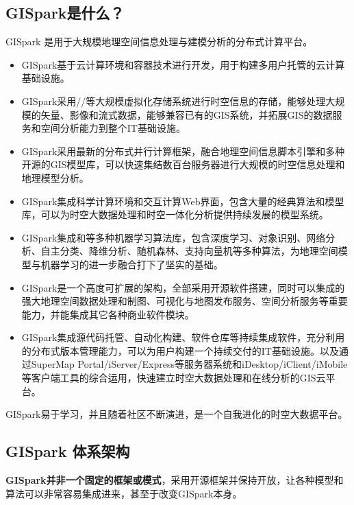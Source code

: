 \documentclass[letterpaper,10pt,english]{sphinxmanual}
\begin{document}
\subsection{GISpark是什么？}
\label{gispark_profile:GISpark_u662f_u4ec0_u4e48_uff1f}
GISpark 是用于大规模地理空间信息处理与建模分析的分布式计算平台。
\begin{itemize}
\item {} 
GISpark基于云计算环境和容器技术进行开发，用于构建多用户托管的云计算基础设施。

\item {} 
GISpark采用//等大规模虚拟化存储系统进行时空信息的存储，能够处理大规模的矢量、影像和流式数据，能够兼容已有的GIS系统，并拓展GIS的数据服务和空间分析能力到整个IT基础设施。

\item {} 
GISpark采用最新的分布式并行计算框架，融合地理空间信息脚本引擎和多种开源的GIS模型库，可以快速集结数百台服务器进行大规模的时空信息处理和地理模型分析。

\item {} 
GISpark集成科学计算环境和交互计算Web界面，包含大量的经典算法和模型库，可以为时空大数据处理和时空一体化分析提供持续发展的模型系统。

\item {} 
GISpark集成和等多种机器学习算法库，包含深度学习、对象识别、网络分析、自主分类、降维分析、随机森林、支持向量机等多种算法，为地理空间模型与机器学习的进一步融合打下了坚实的基础。

\item {} 
GISpark是一个高度可扩展的架构，全部采用开源软件搭建，同时可以集成的强大地理空间数据处理和制图、可视化与地图发布服务、空间分析服务等重要能力，并能集成其它各种商业软件模块。

\item {} 
GISpark集成源代码托管、自动化构建、软件仓库等持续集成软件，充分利用的分布式版本管理能力，可以为用户构建一个持续交付的IT基础设施。以及通过SuperMap
Portal/iServer/Express等服务器系统和iDesktop/iClient/iMobile等客户端工具的综合运用，快速建立时空大数据处理和在线分析的GIS云平台。

\end{itemize}

GISpark易于学习，并且随着社区不断演进，是一个自我进化的时空大数据平台。


\subsection{GISpark 体系架构}
\label{gispark_profile:GISpark-_u4f53_u7cfb_u67b6_u6784}
\textbf{GISpark并非一个固定的框架或模式}，采用开源框架并保持开放，让各种模型和算法可以非常容易集成进来，甚至于改变GISpark本身。
\end{document}
